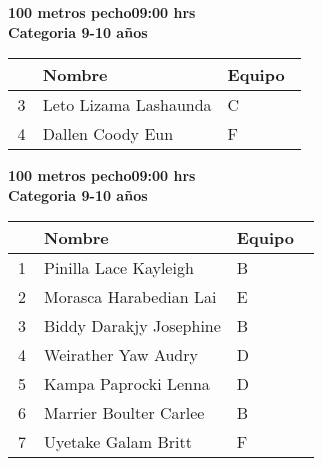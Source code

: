 \begin{minipage}{0.95\linewidth}\vspace{0.5cm} 
\begin{flushleft}
\textbf{
\hspace{-0.15cm}100 metros pecho\hspace{1.5cm}09:00 hrs \\Categoria 9-10 años}\vspace{-0.2cm} 
\end{flushleft}
\begin{tabular}{cp{0.63\linewidth}l}
\hline
& \textbf{Nombre} & \textbf{Equipo} \\ \hline
3 & Leto Lizama Lashaunda & C \\ 
4 & Dallen Coody Eun & F \\ 
\end{tabular}
\end{minipage}
\begin{minipage}{0.95\linewidth}\vspace{0.5cm} 
\begin{flushleft}
\textbf{
\hspace{-0.15cm}100 metros pecho\hspace{1.5cm}09:00 hrs \\Categoria 9-10 años}\vspace{-0.2cm} 
\end{flushleft}
\begin{tabular}{cp{0.63\linewidth}l}
\hline
& \textbf{Nombre} & \textbf{Equipo} \\ \hline
1 & Pinilla Lace Kayleigh & B \\ 
2 & Morasca Harabedian Lai & E \\ 
3 & Biddy Darakjy Josephine & B \\ 
4 & Weirather Yaw Audry & D \\ 
5 & Kampa Paprocki Lenna & D \\ 
6 & Marrier Boulter Carlee & B \\ 
7 & Uyetake Galam Britt & F \\ 
\end{tabular}
\end{minipage}
